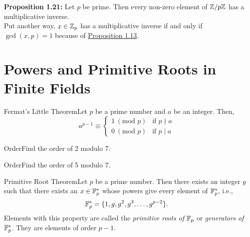 \textbf{Proposition 1.21:} Let \(p\) be prime. Then every non-zero element of \(\mathbb{Z}/p\mathbb{Z}\) has a multiplicative inverse. \\

Put another way, \(x \in \mathbb{Z}_p\) has a multiplicative inverse if and only if \(\gcd(x,p) = 1\) because of \hyperlink{prop 1.13}{Proposition 1.13}. \\


\pfs%

\section{Powers and Primitive Roots in Finite Fields}

\begin{theorem}
    {Fermat's Little Theorem}Let \(p\) be a prime number and \(a\) be an integer. Then, \[a^{p - 1} \equiv \begin{cases}
            1 \ (\text{mod } p) & \text{if } p \nmid a \\
            0 \ (\text{mod } p) & \text{if } p \mid a
        \end{cases}\]
\end{theorem}


\begin{example}
    {Order}Find the order of 2 modulo 7.
\end{example}


\begin{example}
    {Order}Find the order of 5 modulo 7.
\end{example}


\begin{theorem}
    {Primitive Root Theorem}Let \(p\) be a prime number. Then there exists an integer \(g\) such that there exists an \(x \in \mathbb{F}_p^*\) whose powers give every element of \(\mathbb{F}_p^*\), i.e., \[\mathbb{F}_p^* = \{1,g,g^2,g^3.\dots,g^{p - 2}\}.\] Elements with this property are called the \textit{primitive roots of} \(\mathbb{F}_p\) or \textit{generators of} \(\mathbb{F}_p^*\). They are elements of order \(p - 1\).
\end{theorem}

